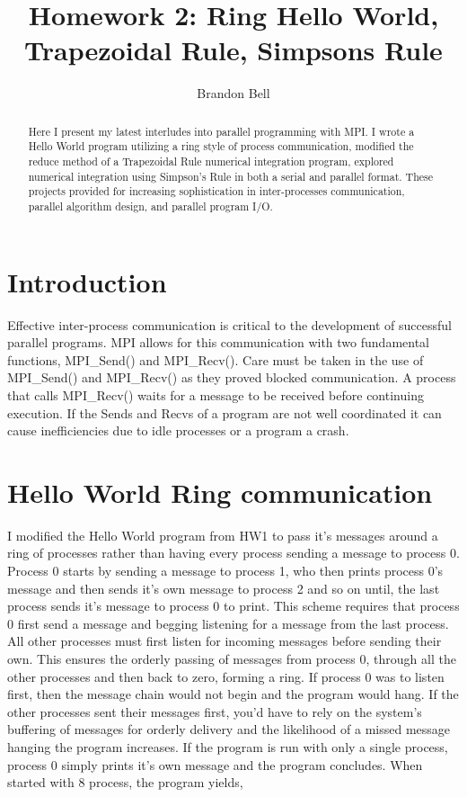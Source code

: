 \documentclass{IEEEtran}
\begin{document}
\title{Homework 2: Ring Hello World, Trapezoidal Rule, Simpsons Rule}
\author{Brandon Bell}
\maketitle
\begin{abstract}
Here I present my latest interludes into parallel programming with MPI. I wrote a Hello World program utilizing a ring style of process communication, modified the reduce method of a Trapezoidal Rule numerical integration program, explored numerical integration using Simpson’s Rule in both a serial and parallel format. These projects provided for increasing sophistication in inter-processes communication, parallel algorithm design, and parallel program I/O.
\end{abstract}

\section{Introduction}
Effective inter-process communication is critical to the development of successful parallel programs. MPI allows for this communication with two fundamental functions, MPI\_Send() and MPI\_Recv(). Care must be taken in the use of MPI\_Send() and MPI\_Recv() as they proved blocked communication. A process that calls MPI\_Recv() waits for a message to be received before continuing execution. If the Sends and Recvs of a program are not well coordinated it can cause inefficiencies due to idle processes or a program a crash. 

\section{Hello World Ring communication}

I modified the Hello World program from HW1 to pass it’s messages around a ring of processes rather than having every process sending a message to process 0. Process 0 starts by sending a message to process 1, who then prints process 0’s message and then sends it’s own message to process 2 and so on until, the last process sends it’s message to process 0 to print. This scheme requires that process 0 first send a message and begging listening for a message from the last process. All other processes must first listen for incoming messages before sending their own. This ensures the orderly passing of messages from process 0, through all the other processes and then back to zero, forming a ring. If process 0 was to listen first, then the message chain would not begin and the program would hang. If the other processes sent their messages first, you’d have to rely on the system’s buffering of messages for orderly delivery and the likelihood of a missed message hanging the program increases. If the program is run with only a single process, process 0 simply prints it’s own message and the program concludes. When started with 8 process, the program yields,
\end{document}
